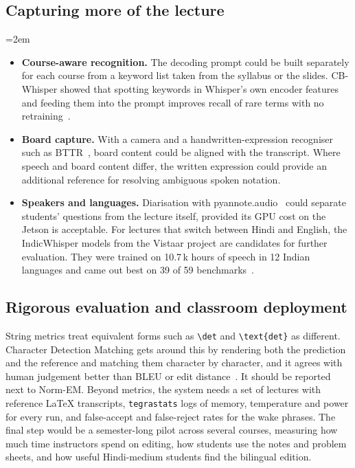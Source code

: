 \documentclass[11pt,a4paper,oneside]{report}
\theoremstyle{definition}
\begin{document}
\subsection{Capturing more of the lecture}
\begingroup\emergencystretch=2em
\begin{itemize}
  \item \textbf{Course-aware recognition.} The decoding prompt could be built separately for each course from a keyword list taken from the syllabus or the slides. CB-Whisper showed that spotting keywords in Whisper's own encoder features and feeding them into the prompt improves recall of rare terms with no retraining~\cite{li2024cbwhisper}.
  \item \textbf{Board capture.} With a camera and a handwritten-expression recogniser such as BTTR~\cite{zhao2021bttr}, board content could be aligned with the transcript. Where speech and board content differ, the written expression could provide an additional reference for resolving ambiguous spoken notation.
  \item \textbf{Speakers and languages.} Diarisation with pyannote.audio~\cite{bredin2023pyannote} could separate students' questions from the lecture itself, provided its GPU cost on the Jetson is acceptable. For lectures that switch between Hindi and English, the IndicWhisper models from the Vistaar project are candidates for further evaluation. They were trained on 10.7\,k hours of speech in 12 Indian languages and came out best on 39 of 59 benchmarks~\cite{bhogale2023vistaar}.
\end{itemize}
\endgroup

\subsection{Rigorous evaluation and classroom deployment}
String metrics treat equivalent forms such as \verb|\det| and \verb|\text{det}| as different. Character Detection Matching gets around this by rendering both the prediction and the reference and matching them character by character, and it agrees with human judgement better than BLEU or edit distance~\cite{wang2025cdm}. It should be reported next to Norm-EM. Beyond metrics, the system needs a set of lectures with reference LaTeX transcripts, \texttt{tegrastats} logs of memory, temperature and power for every run, and false-accept and false-reject rates for the wake phrases. The final step would be a semester-long pilot across several courses, measuring how much time instructors spend on editing, how students use the notes and problem sheets, and how useful Hindi-medium students find the bilingual edition.
\end{document}
